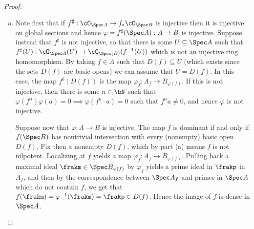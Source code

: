 \begin{problemset}
\begin{proof}
\begin{enumerate}[(a)]
			\item Note first that if $f^\sharp:\cO_{\Spec A}\to f_*\cO_{\Spec B}$ is injective then it is injective on global sections and hence $\varphi = f^\sharp(\Spec A): A\to B$ is injective. Suppose instead that $f^\sharp$ is not injective, so that there is some $U\subseteq \Spec A$ such that $f^\sharp(U):\cO_{\Spec A}(U) \to \cO_{\Spec(B)}(f^{-1}(U))$ which is not an injective ring homomorphism. By taking $f\in A$ such that $D(f) \subseteq U$ (which exists since the sets $D(f)$ are basic opens) we can assume that $U = D(f)$. In this case, the map $f^\sharp(D(f))$ is the map $\varphi_f:A_f \to B_{\varphi(f)}$. If this is not injective, then there is some $n\in \bN$ such that $\varphi(f^n)\varphi(a) = 0\implies \varphi(f^n\cdot a) = 0$ such that $f^na\neq 0$, and hence $\varphi$ is not injective.

				Suppose now that $\varphi:A\to B$ is injective. The map $f$ is dominant if and only if $f(\Spec B)$ has nontrivial intersection with every (nonempty) basic open $D(f)$. Fix then a nonempty $D(f)$, which by part (a) means $f$ is not nilpotent. Localizing at $f$ yields a map $\varphi_f:A_f \to B_{\varphi(f)}$. Pulling back a maximal ideal $\frakm \in \Spec B_{\varphi(f)}$ by $\varphi_f$ yields a prime ideal in $\frakp$ in $A_f$, and then by the correspondence between $\Spec A_f$ and primes in $\Spec A$ which do not contain $f$, we get that $f(\frakm) = \varphi^{-1}(\frakm) = \frakp \in D(f)$. Hence the image of $f$ is dense in $\Spec A$.
		\end{enumerate}
	\end{proof}
\end{problemset}

